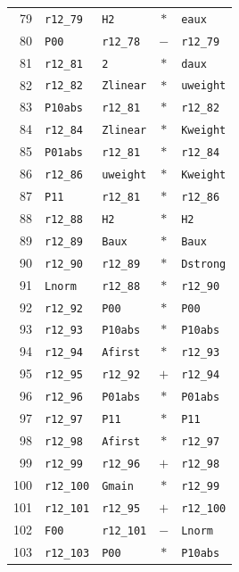 \begin{longtable}{rllcl}
79 & \texttt{r12\_79} & \texttt{H2} & $*$ & \texttt{eaux}\\
80 & \texttt{P00} & \texttt{r12\_78} & $-$ & \texttt{r12\_79}\\
81 & \texttt{r12\_81} & \texttt{2} & $*$ & \texttt{daux}\\
82 & \texttt{r12\_82} & \texttt{Zlinear} & $*$ & \texttt{uweight}\\
83 & \texttt{P10abs} & \texttt{r12\_81} & $*$ & \texttt{r12\_82}\\
84 & \texttt{r12\_84} & \texttt{Zlinear} & $*$ & \texttt{Kweight}\\
85 & \texttt{P01abs} & \texttt{r12\_81} & $*$ & \texttt{r12\_84}\\
86 & \texttt{r12\_86} & \texttt{uweight} & $*$ & \texttt{Kweight}\\
87 & \texttt{P11} & \texttt{r12\_81} & $*$ & \texttt{r12\_86}\\
88 & \texttt{r12\_88} & \texttt{H2} & $*$ & \texttt{H2}\\
89 & \texttt{r12\_89} & \texttt{Baux} & $*$ & \texttt{Baux}\\
90 & \texttt{r12\_90} & \texttt{r12\_89} & $*$ & \texttt{Dstrong}\\
91 & \texttt{Lnorm} & \texttt{r12\_88} & $*$ & \texttt{r12\_90}\\
92 & \texttt{r12\_92} & \texttt{P00} & $*$ & \texttt{P00}\\
93 & \texttt{r12\_93} & \texttt{P10abs} & $*$ & \texttt{P10abs}\\
94 & \texttt{r12\_94} & \texttt{Afirst} & $*$ & \texttt{r12\_93}\\
95 & \texttt{r12\_95} & \texttt{r12\_92} & $+$ & \texttt{r12\_94}\\
96 & \texttt{r12\_96} & \texttt{P01abs} & $*$ & \texttt{P01abs}\\
97 & \texttt{r12\_97} & \texttt{P11} & $*$ & \texttt{P11}\\
98 & \texttt{r12\_98} & \texttt{Afirst} & $*$ & \texttt{r12\_97}\\
99 & \texttt{r12\_99} & \texttt{r12\_96} & $+$ & \texttt{r12\_98}\\
100 & \texttt{r12\_100} & \texttt{Gmain} & $*$ & \texttt{r12\_99}\\
101 & \texttt{r12\_101} & \texttt{r12\_95} & $+$ & \texttt{r12\_100}\\
102 & \texttt{F00} & \texttt{r12\_101} & $-$ & \texttt{Lnorm}\\
103 & \texttt{r12\_103} & \texttt{P00} & $*$ & \texttt{P10abs}\\

\end{longtable}
